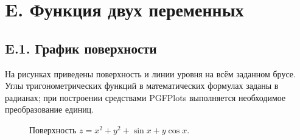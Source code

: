 \documentclass[12pt,a4paper]{article}
\begin{document}
\section*{E. Функция двух переменных}
\subsection*{E.1. График поверхности}
На рисунках приведены поверхность и линии уровня на всём заданном
брусе. Углы тригонометрических функций в математических формулах
заданы в радианах; при построении средствами PGFPlots выполняется
необходимое преобразование единиц.
\begin{figure}[H]\centering
{}
\caption{Поверхность $z=x^2+y^2+\sin x+y\cos x$.}
\end{figure}
\end{document}
